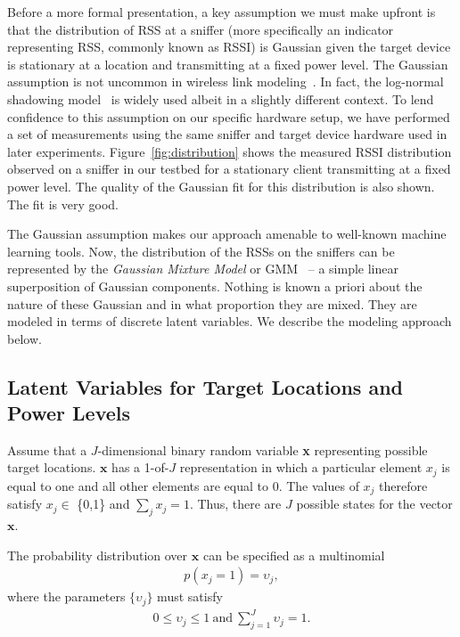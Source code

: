 Before a more formal presentation, a key assumption we must make upfront
is that the distribution of RSS at a sniffer (more specifically an indicator representing RSS, commonly known as RSSI) is Gaussian
given the target device is stationary at a location and transmitting at
a fixed power level. The Gaussian assumption is not uncommon in wireless link modeling~\cite{Haeberlen:2004:PRL:1023720.1023728, Moraes:2006:CWL:1164783.1164799, Tao:2003:WLL:941311.941314}. In fact, the log-normal shadowing model~\cite{Rappaport:2001:WCP:559977} is widely used albeit in a slightly different context. To lend confidence to this assumption on our specific hardware setup, we have performed a set of measurements using the same sniffer and target device hardware used in later experiments. 
Figure~\ref{fig:distribution} shows the measured
RSSI distribution observed on a sniffer in our testbed 
for a stationary client transmitting at a fixed power level. The quality of the Gaussian fit for this distribution is also shown. The fit is very good. 

The Gaussian assumption makes our approach amenable to well-known machine learning tools. Now,
the distribution of the RSSs on the sniffers can be represented by the \emph{Gaussian Mixture Model} or GMM~\cite{Reynolds, Bishop:2006:PRM:1162264} --  a simple linear superposition of Gaussian components. 
Nothing is known a priori about the nature of these Gaussian
and in what proportion they are mixed. They are modeled in terms of discrete latent variables. We describe the modeling approach below.  

\subsection{Latent Variables for Target Locations and Power Levels}
\label{subsec:latentvariablesfortargetlocationsandpowerlevels}

Assume that a $J$-dimensional binary random variable {\bf x} representing possible target locations. $\mathbf{x}$ has a 1-of-$J$ representation in which a particular element $x_{j}$ is equal to one and all other elements are equal to $0$. The values of $x_{j}$ therefore satisfy $x_{j} \in$ \{0,1\} and $\sum_{j} x_{j} = 1$. Thus, there are $J$ possible states for the vector $\mathbf{x}$.

The probability distribution over $\mathbf{x}$ can be specified as a multinomial 
\begin{align}
 p(x_{j} = 1) = \upsilon_{j},
\end{align}
where the parameters $\{\upsilon_{j}\}$ must satisfy
\begin{align}
0 \le \upsilon_{j} \le 1 \ \text{and} \ \sum_{j=1}^{J} \upsilon_{j} = 1.
\end{align}

